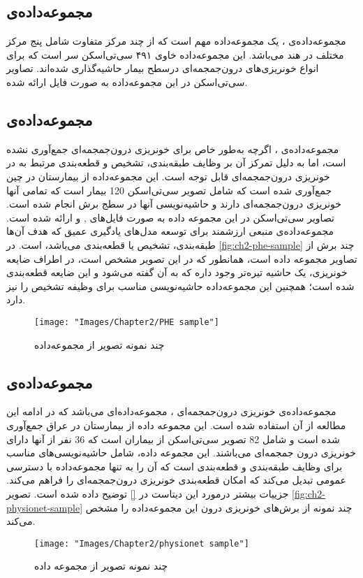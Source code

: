\subsection{مجموعه‌داده‌ی }
مجموعه‌داده‌ی
 \cite{cq500_chilamkurthy2018development}
 ، یک مجموعه‌داده مهم است که از چند مرکز متفاوت شامل پنج مرکز مختلف در هند می‌باشد. این مجموعه‌داده خاوی ۴۹۱ سی‌تی‌اسکن سر است که برای انواع خونریزی‌های درون‌جمجمه‌ای درسطح بیمار حاشیه‌گذاری شده‌اند. تصاویر سی‌تی‌اسکن در این مجموعه‌داده به صورت فایل
   ارائه شده.
\subsection{مجموعه‌داده‌ی }
مجموعه‌داده‌ی 
\cite{PHE_ma2024phe}
، اگرچه به‌طور خاص برای خونریزی درون‌جمجمه‌ای جمع‌آوری نشده است، اما به دلیل تمرکز آن بر وظایف طبقه‌بندی، تشخیص و قطعه‌بندی مرتبط به 
 در خونریزی‌ درون‌جمجمه‌ای قابل توجه است. این مجموعه‌داده‌ از بیمارستان 
 در چین جمع‌آوری شده است که 
  شامل تصویر سی‌تی‌اسکن 120 بیمار است که تمامی آنها خونریزی درون‌جمجمه‌ای دارند و حاشیه‌نویسی آنها در سطج برش انجام شده است. تصاویر سی‌تی‌اسکن در این مجموعه داده به صورت فایل‌های 
  ,
   و
  ارائه شده است. مجموعه‌داده‌ی 
   منبعی ارزشمند برای توسعه مدل‌های یادگیری عمیق که هدف آن‌ها طبقه‌بندی، تشخیص یا قطعه‌بندی می‌باشد، است. در
  \autoref{fig:ch2-phe-sample}
چند برش از تصاویر مجموعه داده 
است، همانطور که در این تصویر مشخص است،‌ در اطراف ضایعه خونریزی،‌ یک حاشیه تیره‌تر وجود داره که به آن 
گفته می‌شود و این ضایعه قطعه‌بندی شده است؛ همچنین این مجموعه‌داده حاشیه‌نویسی مناسب برای وظیفه تشخیص را نیز دارد.
\begin{figure}[H]
\centering
\texttt{[image: "Images/Chapter2/PHE sample"]}
\caption{چند نمونه تصویر از مجموعه‌داده 
}
\label{fig:ch2-phe-sample}
\end{figure}

\subsection{مجموعه‌داده‌ی }
مجموعه‌داده‌ی خونریزی درون‌جمجمه‌ای 
\cite{physionet_hssayeni2020intracranial}،
مجموعه‌داده‌ای می‌باشد که در ادامه این مطالعه از آن استفاده شده است. این مجموعه داده
از بیمارستان
در عراق جمع‌آوری شده است و شامل 82 تصویر سی‌تی‌اسکن از بیماران است که 36 نفر از آنها دارای خونریزی درون جمجمه‌ای می‌باشند.
  این مجموعه داده، شامل حاشیه‌نویسی‌های مناسب برای وظایف طبقه‌بندی و قطعه‌بندی است که آن را به تنها مجموعه‌داده با دسترسی عمومی تبدیل می‌کند که امکان قطعه‌بندی خونریزی درون‌جمجمه‌ای را فراهم می‌کند. جزییات بیشتر درمورد این دیتاست در 
  \autoref{}
توضیح داده شده است.
تصویر
\autoref{fig:ch2-physionet-sample}
چند نمونه از برش‌های خونریزی درون این مجموعه‌داده را مشخص می‌کند.
\begin{figure}[H]
\centering
\texttt{[image: "Images/Chapter2/physionet sample"]}
\caption{چند نمونه تصویر از مجموعه داده
}
\label{fig:ch2-physionet-sample}
\end{figure}


